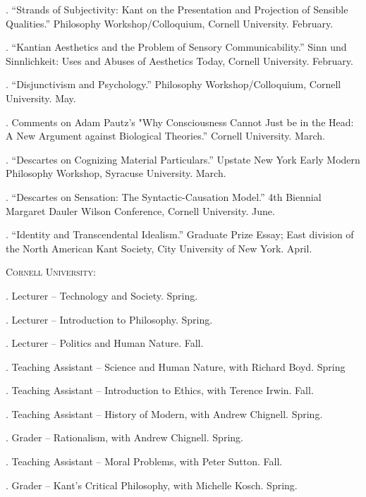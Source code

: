 \documentclass[11pt]{article}
\begin{document}
. ``Strands of Subjectivity: Kant on the Presentation and Projection of Sensible 
Qualities.” Philosophy Workshop/Colloquium, Cornell University. February.

.  ``Kantian Aesthetics and the Problem of Sensory Communicability.” 
Sinn und Sinnlichkeit: Uses and Abuses of Aesthetics Today, Cornell University. February.

. ``Disjunctivism and Psychology.” Philosophy Workshop/Colloquium, Cornell University. May.

. Comments on Adam Pautz’s "Why Consciousness Cannot Just be in the Head: A 			New Argument against Biological Theories.” Cornell University. March.

. ``Descartes on Cognizing Material Particulars.” Upstate New York Early Modern 			Philosophy Workshop, Syracuse University. March.

. ``Descartes on Sensation: The Syntactic-Causation Model.” 4th Biennial 				Margaret Dauler Wilson Conference, Cornell University. June.

. ``Identity and Transcendental Idealism.” Graduate Prize Essay; East division of the North American Kant Society, City University of New York. April.


\bigskip


\medskip

\ind \textsc{Cornell University:}
\medskip

. Lecturer -- Technology and Society. Spring.

. Lecturer -- Introduction to Philosophy. Spring. 

. Lecturer -- Politics and Human Nature. Fall.

. Teaching Assistant -- Science and Human Nature, with Richard Boyd. Spring

. Teaching Assistant -- Introduction to Ethics, with Terence Irwin. Fall.

. Teaching Assistant -- History of Modern, with Andrew Chignell. Spring.

. Grader -- Rationalism, with Andrew Chignell. Spring.

. Teaching Assistant -- Moral Problems, with Peter Sutton. Fall.

. Grader -- Kant’s Critical Philosophy, with Michelle Kosch. Spring.
\medskip
\end{document}
